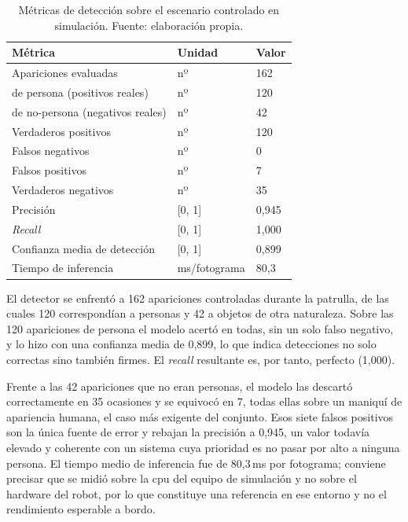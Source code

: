 \begin{table}[htbp]
  \centering
  \small
  \caption{Métricas de detección sobre el escenario controlado en simulación. Fuente:
  elaboración propia.}
  \label{tab:metricas-deteccion}
  \begin{tabular}{@{}>{\raggedright\arraybackslash}p{7.5cm} l l@{}}
    \toprule
    \textbf{Métrica} & \textbf{Unidad} & \textbf{Valor} \\
    \midrule
    Apariciones evaluadas                     & nº     & 162 \\
    \quad de persona (positivos reales)       & nº     & 120 \\
    \quad de no-persona (negativos reales)    & nº     & 42 \\
    Verdaderos positivos                      & nº     & 120 \\
    Falsos negativos                          & nº     & 0 \\
    Falsos positivos                          & nº     & 7 \\
    Verdaderos negativos                      & nº     & 35 \\
    Precisión                                 & [0, 1] & 0,945 \\
    \textit{Recall}                           & [0, 1] & 1,000 \\
    Confianza media de detección              & [0, 1] & 0,899 \\
    Tiempo de inferencia                      & ms/fotograma & 80,3 \\
    \bottomrule
  \end{tabular}
\end{table}

El detector se enfrentó a 162 apariciones controladas durante la patrulla, de las cuales 120
correspondían a personas y 42 a objetos de otra naturaleza. Sobre las 120 apariciones de
persona el modelo acertó en todas, sin un solo falso negativo, y lo hizo con una confianza
media de 0,899, lo que indica detecciones no solo correctas sino también firmes. El
\textit{recall} resultante es, por tanto, perfecto (1,000).

Frente a las 42 apariciones que no eran personas, el modelo las descartó correctamente en 35
ocasiones y se equivocó en 7, todas ellas sobre un maniquí de apariencia humana, el caso más
exigente del conjunto. Esos siete falsos positivos son la única fuente de error y rebajan la
precisión a 0,945, un valor todavía elevado y coherente con un sistema cuya prioridad es no
pasar por alto a ninguna persona. El tiempo medio de inferencia fue de 80,3\,ms por fotograma;
conviene precisar que se midió sobre la \acrshort{cpu} del equipo de simulación y no sobre el
hardware del robot, por lo que constituye una referencia en ese entorno y no el rendimiento
esperable a bordo.

